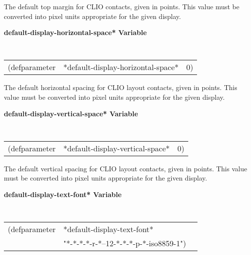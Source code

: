 \begin{flushright} \parbox[t]{6.125in}{
The default top margin for CLIO  contacts, given in
points. This value must be converted into pixel units appropriate for the given
display.

}\end{flushright}

{\samepage
{\large {\bf *default-display-horizontal-space* \hfill Variable}} 
\begin{flushright} \parbox[t]{6.125in}{
\tt
\begin{tabular}{lll}
\raggedright
(defparameter & *default-display-horizontal-space* & 0)
\end{tabular}
\rm

}\end{flushright}}

\begin{flushright} \parbox[t]{6.125in}{
The default horizontal spacing for CLIO layout contacts, given in
points. This value must be converted into pixel units appropriate for the given
display.

}\end{flushright}


{\samepage
{\large {\bf *default-display-vertical-space* \hfill Variable}} 
\begin{flushright} \parbox[t]{6.125in}{
\tt
\begin{tabular}{lll}
\raggedright
(defparameter & *default-display-vertical-space* & 0)
\end{tabular}
\rm

}\end{flushright}}

\begin{flushright} \parbox[t]{6.125in}{
The default vertical spacing for CLIO layout contacts, given in
points. This value must be converted into pixel units appropriate for the given
display.

}\end{flushright}


{\samepage
{\large {\bf *default-display-text-font* \hfill Variable}} 
\begin{flushright} \parbox[t]{6.125in}{
\tt
\begin{tabular}{lll}
\raggedright
(defparameter & *default-display-text-font* \\
              & "*-*-*-*-r-*--12-*-*-*-p-*-iso8859-1")
\end{tabular}
\rm

}\end{flushright}}

